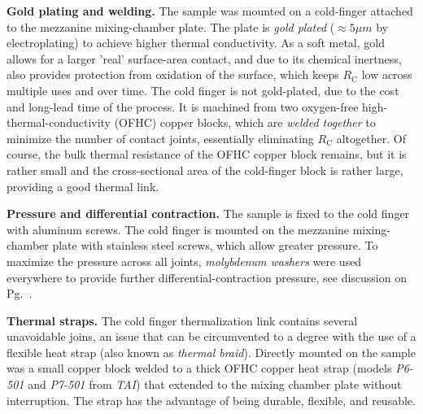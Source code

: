 \textbf{Gold plating and welding. }The sample was mounted on a cold-finger
attached to the mezzanine mixing-chamber plate. The plate is \emph{gold
plated }($\approx5\mu m$ by electroplating) to achieve higher thermal
conductivity. As a soft metal, gold allows for a larger 'real' surface-area
contact, and due to its chemical inertness, also provides protection
from oxidation of the surface, which keeps $R_{\mathrm{C}}$ low across
multiple uses and over time. The cold finger is not gold-plated, due
to the cost and long-lead time of the process. It is machined from
two oxygen-free high-thermal-conductivity (OFHC) copper blocks, which
are \emph{welded together }to minimize the number of contact joints,
essentially eliminating $R_{\mathrm{C}}$ altogether. Of course, the
bulk thermal resistance of the OFHC copper block remains, but it is
rather small and the cross-sectional area of the cold-finger block
is rather large, providing a good thermal link.

\textbf{Pressure and differential contraction. }The sample is fixed
to the cold finger with aluminum screws. The cold finger is mounted
on the mezzanine mixing-chamber plate with stainless steel screws,
which allow greater pressure. To maximize the pressure across all
joints, \emph{molybdenum washers }were used everywhere to provide
further differential-contraction pressure, see discussion on Pg.~\pageref{par:molybdenum}. 

\textbf{Thermal straps. }The cold finger thermalization link contains
several unavoidable joins, an issue that can be circumvented to a
degree with the use of a flexible heat strap (also known as \emph{thermal
braid}). Directly mounted on the sample was a small copper block welded
to a thick OFHC copper heat strap (models \emph{P6-501} and \emph{P7-501}
from \emph{TAI}) that extended to the mixing chamber plate without
interruption. The strap has the advantage of being durable, flexible,
and reusable.

